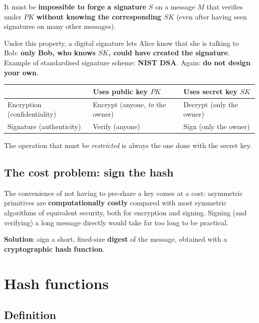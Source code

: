 \begin{definition}
It must be \textbf{impossible to forge a signature} $S$ on a message $M$ that verifies under $PK$ \textbf{without knowing the corresponding $SK$} (even after having seen signatures on many other messages).
\end{definition}

Under this property, a digital signature lets Alice know that she is talking to Bob: \textbf{only Bob, who knows $SK$, could have created the signature}. Example of standardised signature scheme: \textbf{NIST DSA}. Again: \textbf{do not design your own}.

\begin{remark}
\begin{center}
\begin{tabular}{@{}lll@{}}
\toprule
 & \textbf{Uses public key $PK$} & \textbf{Uses secret key $SK$} \\
\midrule
Encryption (confidentiality) & Encrypt (anyone, \emph{to} the owner) & Decrypt (only the owner) \\
Signature (authenticity) & Verify (anyone) & Sign (only the owner) \\
\bottomrule
\end{tabular}
\end{center}
The operation that must be \emph{restricted} is always the one done with the secret key.
\end{remark}

\subsection{The cost problem: sign the hash}

The convenience of not having to pre-share a key comes at a cost: asymmetric primitives are \textbf{computationally costly} compared with most symmetric algorithms of equivalent security, both for encryption and signing. Signing (and verifying) a long message directly would take far too long to be practical.

\textbf{Solution}: sign a short, fixed-size \textbf{digest} of the message, obtained with a \textbf{cryptographic hash function}.

\section{Hash functions}

\subsection{Definition}

